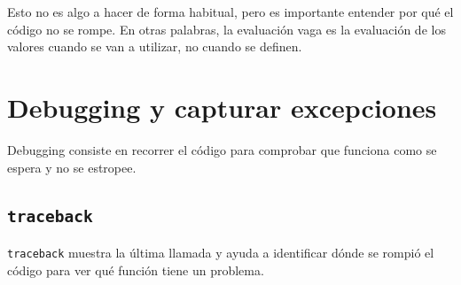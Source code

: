 \documentclass{config/apuntes}\usepackage[]{graphicx}\usepackage[]{xcolor}
\newcommand{\code}[1]{\texttt{#1}}
\begin{document}
Esto no es algo a hacer de forma habitual, pero es importante entender por qué el código no se rompe. En otras palabras, la evaluación vaga es la evaluación de los valores cuando se van a utilizar, no cuando se definen.

\section{Debugging y capturar excepciones}
Debugging consiste en recorrer el código para comprobar que funciona como se espera y no se estropee. 

\subsection{\code{traceback}}
\code{traceback} muestra la última llamada y ayuda a identificar dónde se rompió el código para ver qué función tiene un problema. 
\end{document}
